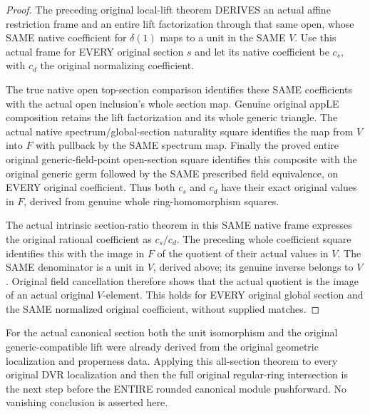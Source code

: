 \begin{proof}
The preceding original local-lift theorem DERIVES an actual affine
restriction frame and an entire lift factorization through that
same open, whose SAME native coefficient for $\delta(1)$ maps to
a unit in the SAME $V$. Use this actual frame for EVERY original
section $s$ and let its native coefficient be $c_s$, with $c_d$
the original normalizing coefficient.

The true native open top-section comparison identifies these
SAME coefficients with the actual open inclusion's whole section
map. Genuine original appLE composition retains the lift
factorization and its whole generic triangle. The actual native
spectrum/global-section naturality square identifies the map from
$V$ into $F$ with pullback by the SAME spectrum map. Finally the
proved entire original generic-field-point open-section square
identifies this composite with the original generic germ followed
by the SAME prescribed field equivalence, on EVERY original
coefficient. Thus both $c_s$ and $c_d$ have their exact original
values in $F$, derived from genuine whole ring-homomorphism squares.

The actual intrinsic section-ratio theorem in this SAME native
frame expresses the original rational coefficient as $c_s/c_d$.
The preceding whole coefficient square identifies this with the
image in $F$ of the quotient of their actual values in $V$.
The SAME denominator is a unit in $V$, derived above; its genuine
inverse belongs to $V$. Original field cancellation therefore
shows that the actual quotient is the image of an actual original
$V$-element. This holds for EVERY original global section and the
SAME normalized original coefficient, without supplied matches.
\end{proof}

For the actual canonical section both the unit isomorphism and the
original generic-compatible lift were already derived from the
original geometric localization and properness data. Applying this
all-section theorem to every original DVR localization and then
the full original regular-ring intersection is the next step
before the ENTIRE rounded canonical module pushforward. No
vanishing conclusion is asserted here.
